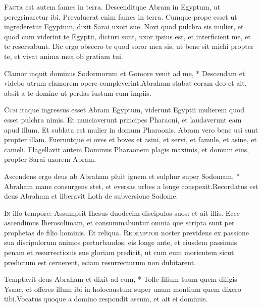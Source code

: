 \begin{multicols*}{2}
\lettrine[lines=2]{\zallmancaps \color{Red} F}{acta} est autem fames in terra. Descenditque Abram in Egyptum, ut peregrinaretur ibi. Prevaluerat enim fames in terra. Cumque prope esset ut ingrederetur Egyptum, dixit Sarai uxori sue. Novi quod pulchra sis mulier, et quod cum viderint te Egyptii, dicturi sunt, uxor ipsius est, et interficient me, et te reservabunt. Dic ergo obsecro te quod soror mea sis, ut bene sit michi propter te, et vivat anima mea ob gratiam tui.
\begin{responsory}
{Clamor inquit dominus Sodormorum et Gomore venit ad me, * Descendam et videbo utrum clamorem opere compleverint.}{Abraham stabat coram deo et ait, absit a te domine ut perdas iustum cum impiis.}
\end{responsory}
\lettrine[lines=2]{\zallmancaps \color{Blue} C}{um} itaque ingressus esset Abram Egyptum, viderunt Egyptii mulierem quod esset pulchra nimis. Et nunciaverunt principes Pharaoni, et laudaverunt eam apud illum. Et sublata est mulier in domum Pharaonis. Abram vero bene usi sunt propter illam. Fueruntque ei oves et boves et asini, et servi, et famule, et asine, et cameli. Flagellavit autem Dominus Pharaonem plagis maximis, et domum eius, propter Sarai uxorem Abram.
\begin{responsory-doxology}
{Ascendens ergo deus ab Abraham pluit ignem et sulphur super Sodomam, * Abraham mane consurgens stet, et eversas urbes a longe conspexit.}{Recordatus est deus Abraham et liberavit Loth de subversione Sodome.}
\end{responsory-doxology}
\lettrine[lines=2]{\zallmancaps \color{Red} I}{n} illo tempore: Assumpsit Ihesus duodecim discipulos suos: et ait illis. Ecce ascendimus Iherosolimam, et consummabuntur omnia que scripta sunt per prophetas de filio hominis. Et reliqua.
\lettrine[lines=2]{\zallmancaps \color{Blue} R}{edemptor} noster previdens ex passione sua discipulorum animos perturbandos, eis longe ante, et eiusdem passionis penam et resurrectionis sue gloriam predicit, ut cum eum morientem sicut predictum est cernerent, eciam resurrecturum non dubitarent.
\begin{responsory}
{Temptavit deus Abraham et dixit ad eum, * Tolle filium tuum quem diligis Ysaac, et offeres illum ibi in holocaustum super unum montium quem dixero tibi.}{Vocatus quoque a domino respondit assum, et ait ei dominus.}

\end{responsory}
\end{multicols*}
